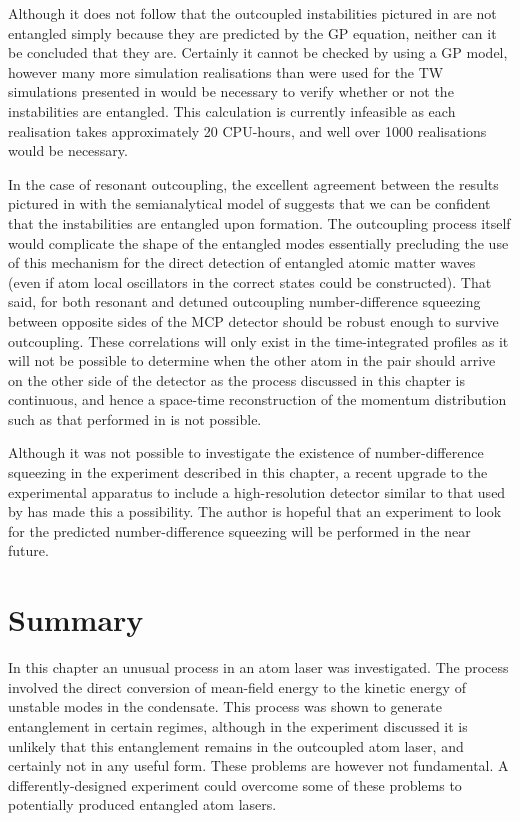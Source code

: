 Although it does not follow that the outcoupled instabilities pictured in  are not entangled simply because they are predicted by the GP equation, neither can it be concluded that they are.  Certainly it cannot be checked by using a GP model, however many more simulation realisations than were used for the TW simulations presented in  would be necessary to verify whether or not the instabilities are entangled.  This calculation is currently infeasible as each realisation takes approximately 20 CPU-hours, and well over 1000 realisations would be necessary.  

In the case of resonant outcoupling, the excellent agreement between the results pictured in  with the semianalytical model of  suggests that we can be confident that the instabilities are entangled upon formation.  The outcoupling process itself would complicate the shape of the entangled modes essentially precluding the use of this mechanism for the direct detection of entangled atomic matter waves (even if atom local oscillators in the correct states could be constructed).  That said, for both resonant and detuned outcoupling number-difference squeezing between opposite sides of the MCP detector should be robust enough to survive outcoupling.  These correlations will only exist in the time-integrated profiles as it will not be possible to determine when the other atom in the pair should arrive on the other side of the detector as the process discussed in this chapter is continuous, and hence a space-time reconstruction of the momentum distribution such as that performed in \citep{Perrin:2007} is not possible.

Although it was not possible to investigate the existence of number-difference squeezing in the experiment described in this chapter, a recent upgrade to the experimental apparatus to include a high-resolution detector similar to that used by \citet{Perrin:2007} has made this a possibility.  The author is hopeful that an experiment to look for the predicted number-difference squeezing will be performed in the near future.

\section{Summary}

In this chapter an unusual process in an atom laser was investigated.  The process involved the direct conversion of mean-field energy to the kinetic energy of unstable modes in the condensate.  This process was shown to generate entanglement in certain regimes, although in the experiment discussed it is unlikely that this entanglement remains in the outcoupled atom laser, and certainly not in any useful form.  These problems are however not fundamental.  A differently-designed experiment could overcome some of these problems to potentially produced entangled atom lasers.

